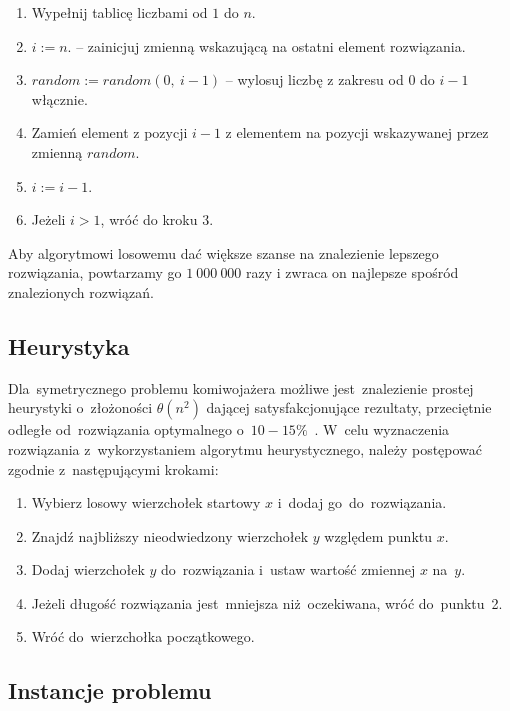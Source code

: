 \begin{enumerate}
    \item Wypełnij tablicę liczbami od $1$ do $n$.
    \item $i := n$. -- zainicjuj zmienną wskazującą na ostatni element rozwiązania.
    \item $random := random(0,\ i - 1) $ -- wylosuj liczbę z zakresu od $0$ do $i - 1$ włącznie.
    \item Zamień element z pozycji $i-1$ z elementem na pozycji wskazywanej przez zmienną $random$.
    \item $i := i-1$.
    \item Jeżeli $i>1$, wróć do kroku 3.
\end{enumerate}

Aby algorytmowi losowemu dać większe szanse na znalezienie lepszego rozwiązania, powtarzamy go $1\ 000\ 000$ razy i zwraca on najlepsze spośród znalezionych rozwiązań.

\subsection{Heurystyka}

Dla~symetrycznego problemu komiwojażera możliwe jest~znalezienie prostej heurystyki o~złożoności $\theta(n^2)$ dającej satysfakcjonujące rezultaty, przeciętnie odległe od~rozwiązania optymalnego o~$10-15\%$~\cite{Heuristic}. W~celu wyznaczenia rozwiązania z~wykorzystaniem algorytmu heurystycznego, należy postępować zgodnie z~następującymi krokami:

\newpage

\begin{enumerate}
    \item Wybierz losowy wierzchołek startowy $x$ i~dodaj go~do~rozwiązania.
    \item Znajdź najbliższy nieodwiedzony wierzchołek $y$ względem punktu $x$.
  	\item Dodaj wierzchołek $y$ do~rozwiązania i~ustaw wartość zmiennej $x$ na~$y$.
    \item Jeżeli długość rozwiązania jest~mniejsza niż~oczekiwana, wróć do~punktu~2.
    \item Wróć do~wierzchołka początkowego.
\end{enumerate}

\subsection{Instancje problemu}

